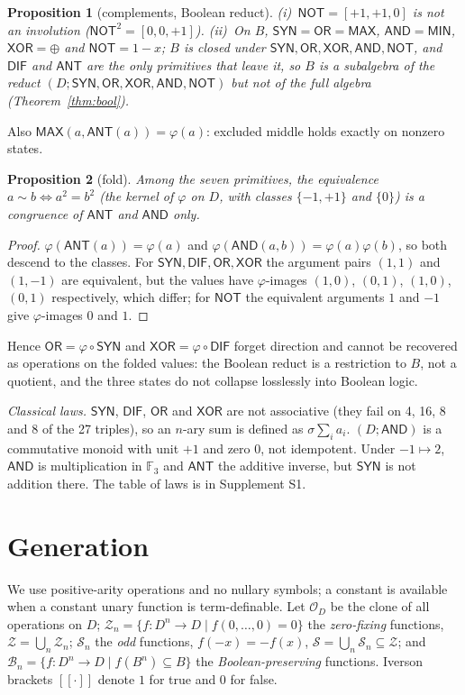 \documentclass[conference]{IEEEtran}
\newcommand{\D}{D}
\newcommand{\sgn}{\sigma}
\newcommand{\fold}{\varphi}
\newcommand{\SYN}{\mathsf{SYN}}
\newcommand{\DIF}{\mathsf{DIF}}
\newcommand{\OR}{\mathsf{OR}}
\newcommand{\XOR}{\mathsf{XOR}}
\newcommand{\AND}{\mathsf{AND}}
\newcommand{\NOT}{\mathsf{NOT}}
\newcommand{\ANT}{\mathsf{ANT}}
\newcommand{\MAX}{\mathsf{MAX}}
\newcommand{\MIN}{\mathsf{MIN}}
\newcommand{\Z}{\mathcal Z}
\newcommand{\Odd}{\mathcal S}
\newcommand{\BP}{\mathcal B}
\newcommand{\OD}{\mathcal{O}_{\D}}
\newcommand{\iv}[1]{[\![#1]\!]}
\newtheorem{proposition}{Proposition}
\theoremstyle{remark}
\begin{document}
	\begin{proposition}[complements, Boolean reduct]\label{prop:not}
		(i)~$\NOT=[+1,+1,0]$ is not an involution ($\NOT^2=[0,0,+1]$). (ii)~On $B$, $\SYN=\OR=\MAX$, $\AND=\MIN$, $\XOR=\oplus$ and $\NOT=1-x$; $B$ is closed under $\SYN,\OR,\XOR,\AND,\NOT$, and $\DIF$ and $\ANT$ are the only primitives that leave it, so $B$ is a subalgebra of the reduct $(\D;\SYN,\OR,\XOR,\AND,\NOT)$ but not of the full algebra (Theorem~\ref{thm:bool}).
	\end{proposition}
	Also $\MAX(a,\ANT(a))=\fold(a)$: excluded middle holds exactly on nonzero states.
	
	\begin{proposition}[fold]\label{prop:fold}
		Among the seven primitives, the equivalence $a\sim b\iff a^2=b^2$ (the kernel of $\fold$ on $\D$, with classes $\{-1,+1\}$ and $\{0\}$) is a congruence of $\ANT$ and $\AND$ only.
	\end{proposition}
	\begin{proof}
		$\fold(\ANT(a))=\fold(a)$ and $\fold(\AND(a,b))=\fold(a)\fold(b)$, so both descend to the classes. For $\SYN,\DIF,\OR,\XOR$ the argument pairs $(1,1)$ and $(1,-1)$ are equivalent, but the values have $\fold$-images $(1,0)$, $(0,1)$, $(1,0)$, $(0,1)$ respectively, which differ; for $\NOT$ the equivalent arguments $1$ and $-1$ give $\fold$-images $0$ and $1$.
	\end{proof}
	Hence $\OR=\fold\circ\SYN$ and $\XOR=\fold\circ\DIF$ forget direction and cannot be recovered as operations on the folded values: the Boolean reduct is a restriction to $B$, not a quotient, and the three states do not collapse losslessly into Boolean logic.
	
	\emph{Classical laws.} $\SYN$, $\DIF$, $\OR$ and $\XOR$ are not associative (they fail on 4, 16, 8 and 8 of the 27 triples), so an $n$-ary sum is defined as $\sgn\sum_ia_i$. $(\D;\AND)$ is a commutative monoid with unit $+1$ and zero $0$, not idempotent. Under $-1\mapsto2$, $\AND$ is multiplication in $\mathbb F_3$ and $\ANT$ the additive inverse, but $\SYN$ is not addition there. The table of laws is in Supplement S1.
	
	\section{Generation}\label{sec:clone}
	We use positive-arity operations and no nullary symbols; a constant is available when a constant unary function is term-definable. Let $\OD$ be the clone of all operations on $\D$; $\Z_n=\{f:\D^n\to\D\mid f(0,\dots,0)=0\}$ the \emph{zero-fixing} functions, $\Z=\bigcup_n\Z_n$; $\Odd_n$ the \emph{odd} functions, $f(-x)=-f(x)$, $\Odd=\bigcup_n\Odd_n\subseteq\Z$; and $\BP_n=\{f:\D^n\to\D\mid f(B^n)\subseteq B\}$ the \emph{Boolean-preserving} functions. Iverson brackets $\iv{\cdot}$ denote $1$ for true and $0$ for false.
	
\end{document}
